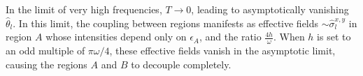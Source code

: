 \documentclass[12pt]{iopart}
\begin{document}
In the limit of very high frequencies, $T\rightarrow 0$, leading to asymptotically vanishing $\hat{\theta}_l$. In this limit, the coupling between regions manifests as effective fields $\sim \hat{\sigma}^{x,y}_l$ in region $A$ whose intensities depend only on $\epsilon_A$, and the ratio $\frac{4h}{\omega}$. When $h$ is set to an odd multiple of $\pi\omega/4$, these effective fields vanish in the asymptotic limit, causing the regions $A$ and $B$ to decouple completely.



\end{document}
